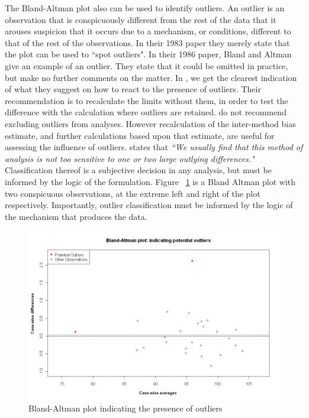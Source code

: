 \documentclass[12pt, a4paper]{report}
\theoremstyle{plain}
\theoremstyle{definition}
\theoremstyle{remark}
\begin{document}
	The Bland-Altman plot also can be used to identify outliers. An outlier is an observation that is conspicuously different from the rest of the data that it arouses suspicion that it occurs due to a mechanism, or conditions, different to that of the rest of the observations. In their 1983 paper they merely state that the plot can be used to
	``spot outliers". In their 1986 paper, Bland and Altman give an example of an
	outlier. They state that it could be omitted in practice, but make
	no further comments on the matter. In \citet{BA99}, we get the clearest indication of
	what they suggest on how to react to the presence of
	outliers. Their recommendation is to recalculate the limits
	without them, in order to test the difference with the calculation
	where outliers are retained. \citet*{BA99} do not recommend excluding outliers from analyses. However recalculation of the inter-method bias estimate, and further calculations based upon that estimate, are useful for assessing the influence of outliers. \citet{BA99} states that \emph{``We usually find that this method of analysis is not too sensitive to one or two large outlying differences."}
	Classification thereof is a subjective decision in any analysis, but must be informed by the logic of the formulation. Figure ~\ref{BAOutliers} is a Bland Altman plot with two
	conspicuous observations, at the extreme left and right of the
	plot respectively. Importantly, outlier classification must be informed by the logic of the mechanism that produces the data.
	
	
	
	
	\begin{figure}[h!]
		\begin{center}
			\includegraphics[width=125mm]{images/BAOutliers.jpeg}
			\caption{Bland-Altman plot indicating the presence of outliers}\label{BAOutliers}
		\end{center}
	\end{figure}
	
\end{document}
